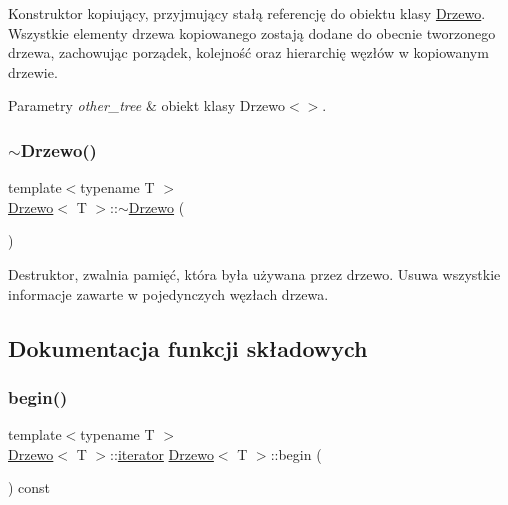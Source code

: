 Konstruktor kopiujący, przyjmujący stałą referencję do obiektu klasy \hyperlink{class_drzewo}{Drzewo}. Wszystkie elementy drzewa kopiowanego zostają dodane do obecnie tworzonego drzewa, zachowując porządek, kolejność oraz hierarchię węzłów w kopiowanym drzewie.


\begin{DoxyParams}{Parametry}
{\em other\+\_\+tree} & obiekt klasy Drzewo$<$$>$. \\
\hline
\end{DoxyParams}
\mbox{\label{class_drzewo_acbc76af50077660d8a75eaa4e086eac1}} 
\subsubsection{\texorpdfstring{$\sim$\+Drzewo()}{~Drzewo()}}
{\footnotesize\ttfamily template$<$typename T $>$ \\
\hyperlink{class_drzewo}{Drzewo}$<$ T $>$\+::$\sim$\hyperlink{class_drzewo}{Drzewo} (\begin{DoxyParamCaption}{ }\end{DoxyParamCaption})}

Destruktor, zwalnia pamięć, która była używana przez drzewo. Usuwa wszystkie informacje zawarte w pojedynczych węzłach drzewa. 

\subsection{Dokumentacja funkcji składowych}
\mbox{\label{class_drzewo_a2f6661025ebf9a3f6c2df1726a0d46ca}} 
\subsubsection{\texorpdfstring{begin()}{begin()}}
{\footnotesize\ttfamily template$<$typename T $>$ \\
\hyperlink{class_drzewo}{Drzewo}$<$ T $>$\+::\hyperlink{class_drzewo_1_1iterator}{iterator} \hyperlink{class_drzewo}{Drzewo}$<$ T $>$\+::begin (\begin{DoxyParamCaption}{ }\end{DoxyParamCaption}) const\hspace{0.3cm}{\ttfamily [inline]}}

